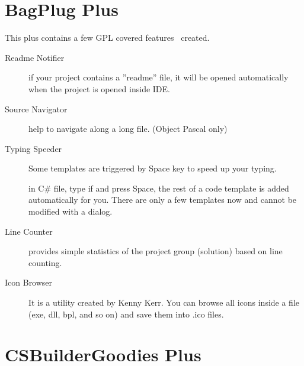 \section{BagPlug Plus}
This plus contains a few GPL covered features \lextm\ created.

\begin{description}

  \item[Readme Notifier] if your project contains a ''readme'' file, it will be
  opened automatically when the project is opened inside IDE.
  \item[Source Navigator] help to navigate along a long file. (Object Pascal
  only)
  \item[Typing Speeder] Some templates are triggered by Space
key to speed up your typing.

in C\# file, type if and press Space, the rest of a code template is added
automatically for you. There are only a few templates now and cannot be
modified with a dialog.


%
%


\item[Line Counter] provides simple statistics of the project group (solution)
based on line counting.
  \item[Icon Browser] It is a utility created by Kenny Kerr. You can browse all
  icons inside a file (exe, dll, bpl, and so on) and save them into .ico files.
\end{description}

\section{CSBuilderGoodies Plus}


